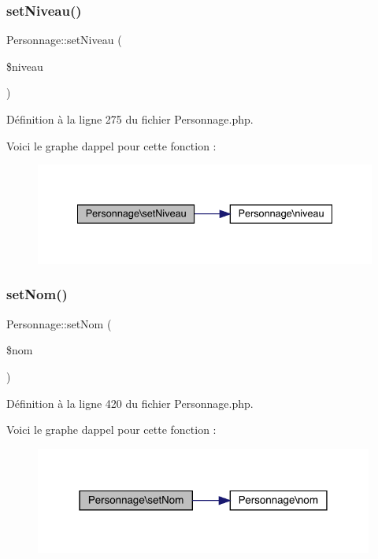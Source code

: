 \subsubsection{\texorpdfstring{set\+Niveau()}{setNiveau()}}
{\footnotesize\ttfamily Personnage\+::set\+Niveau (\begin{DoxyParamCaption}\item[{}]{\$niveau }\end{DoxyParamCaption})}



Définition à la ligne 275 du fichier Personnage.\+php.

Voici le graphe d\textquotesingle{}appel pour cette fonction \+:\nopagebreak
\begin{figure}[H]
\begin{center}
\leavevmode
\includegraphics[width=335pt]{class_personnage_a309bc50e0ac35a942d8ffceb5a4556a9_cgraph}
\end{center}
\end{figure}
\mbox{\label{class_personnage_adb31f60912f384e0de79497f9128d549}} 
\subsubsection{\texorpdfstring{set\+Nom()}{setNom()}}
{\footnotesize\ttfamily Personnage\+::set\+Nom (\begin{DoxyParamCaption}\item[{}]{\$nom }\end{DoxyParamCaption})}



Définition à la ligne 420 du fichier Personnage.\+php.

Voici le graphe d\textquotesingle{}appel pour cette fonction \+:\nopagebreak
\begin{figure}[H]
\begin{center}
\leavevmode
\includegraphics[width=315pt]{class_personnage_adb31f60912f384e0de79497f9128d549_cgraph}
\end{center}
\end{figure}
\mbox{\label{class_personnage_aeb2ef67eccbeba4a3a296895b7570359}} 
